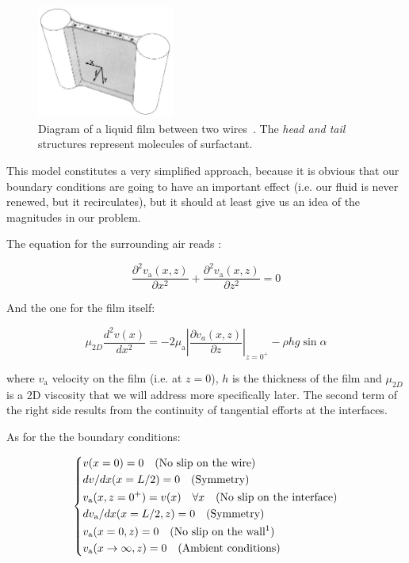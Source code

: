 \begin{figure}[H]
	\centering
	\includegraphics[width=0.4\textwidth]{archivos/FilmBetweenWires.png}
	\caption{Diagram of a liquid film between two wires~\cite{Rutgers2001}. The \textit{head and tail} structures represent molecules of surfactant.}
	\label{flowing_film}
\end{figure}

This model constitutes a very simplified approach, because it is obvious that our boundary conditions are going to have an important effect (i.e. our fluid is never renewed, but it recirculates), but it should at least give us an idea of the magnitudes in our problem.

The equation for the surrounding air reads :

\begin{equation}
\frac{\partial^{2} v_{\mathrm{a}}(x, z)}{\partial x^{2}}+\frac{\partial^{2} v_{\mathrm{a}}(x, z)}{\partial z^{2}}=0
\label{air_velocity}
\end{equation}

And the one for the film itself:

\begin{equation}
\mu_{2D} \frac{d^{2} v(x)}{d x^{2}}=-2 \mu_{\mathrm{a}}\left|\frac{\partial v_{a}(x, z)}{\partial z}\right|_{z=0^{+}}-\rho h g \sin \alpha
\label{film_velocity}
\end{equation}

where $v_{\mathrm{a}}$ velocity on the film (i.e. at $z = 0$), $h$ is the thickness of the film and $\mu_{2D}$ is a 2D viscosity that we will address more specifically later. The second term of the right side results from the continuity of tangential efforts at the interfaces.

As for the the boundary conditions:

\begin{equation}
\left\{
\begin{aligned}
& v(x=0) = 0 \quad \text{(No slip on the wire)} \\
& dv/dx(x=L/2) = 0 \quad \text{(Symmetry)} \\
& v_{\mathrm{a}}(x,z=0^+) = v(x) \quad \forall x \quad \text{(No slip on the interface)}\\
& dv_{\mathrm{a}}/dx(x=L/2,z) = 0 \quad \text{(Symmetry)} \\
& v_{\mathrm{a}}(x=0,z) = 0 \quad \text{(No slip on the wall\protect\footnotemark)} \\
& v_{\mathrm{a}}(x \rightarrow \infty,z) = 0 \quad \text{(Ambient conditions)}
\end{aligned}
\right.
\end{equation}

